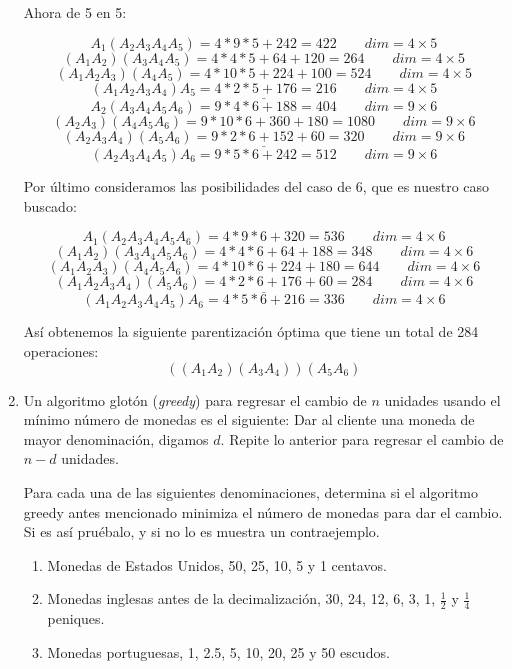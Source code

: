 \documentclass[11pt,letterpaper]{article}
\begin{document}
\begin{enumerate}[leftmargin=*]
    Ahora de 5 en 5:

    \[ A_1(A_2A_3A_4A_5) = 4*9*5+242 = 422 \qquad dim = 4\times5 \]    
    \[ (A_1A_2)(A_3A_4A_5) = 4*4*5+64+120 = 264 \qquad dim = 4\times5 \]  
    \[ (A_1A_2A_3)(A_4A_5) = 4*10*5+224+100 = 524 \qquad dim = 4\times5 \]  
    \[ \underline{(A_1A_2A_3A_4)A_5 = 4*2*5+176 = 216 \qquad dim = 4\times5} \]  
    \[ A_2(A_3A_4A_5A_6) = 9*4*6+188 = 404 \qquad dim = 9\times6 \]    
    \[ (A_2A_3)(A_4A_5A_6) = 9*10*6+360+180 = 1080 \qquad dim = 9\times6 \]    
    \[ \underline{(A_2A_3A_4)(A_5A_6) = 9*2*6+152+60 = 320 \qquad dim = 9\times6} \]    
    \[ (A_2A_3A_4A_5)A_6 = 9*5*6+242 = 512 \qquad dim = 9\times6 \]    

    Por último consideramos las posibilidades del caso de 6, que es nuestro caso buscado:

    \[ A_1(A_2A_3A_4A_5A_6) = 4*9*6+320 = 536 \qquad dim = 4\times6 \]
    \[ (A_1A_2)(A_3A_4A_5A_6) = 4*4*6+64+188 = 348 \qquad dim = 4\times6 \]
    \[ (A_1A_2A_3)(A_4A_5A_6) = 4*10*6+224+180 = 644 \qquad dim = 4\times6 \]
    \[ \underline{(A_1A_2A_3A_4)(A_5A_6) = 4*2*6+176+60 = 284 \qquad dim = 4\times6} \]
    \[ (A_1A_2A_3A_4A_5)A_6 = 4*5*6+216 = 336 \qquad dim = 4\times6 \]

    Así obtenemos la siguiente parentización óptima que tiene un total de 284 operaciones:
    \[ ((A_1A_2)(A_3A_4))(A_5A_6) \]

    \item Un algoritmo glotón (\textit{greedy}) para regresar el cambio de $n$ unidades usando el mínimo número de monedas es el siguiente: Dar al cliente una moneda de mayor denominación, digamos $d$. Repite lo anterior para regresar el cambio de $n - d$ unidades.
    
    Para cada una de las siguientes denominaciones, determina si el algoritmo greedy antes mencionado minimiza el número de monedas para dar el cambio. Si es así pruébalo, y si no lo es muestra un contraejemplo.
    
    \begin{enumerate}[label=\alph*)]
        \item Monedas de Estados Unidos, 50, 25, 10, 5 y 1 centavos.
        
        \item Monedas inglesas antes de la decimalización, 30, 24, 12, 6, 3, 1, $\frac{1}{2}$ y $\frac{1}{4}$ peniques.
        
        \item Monedas portuguesas, 1, 2.5, 5, 10, 20, 25 y 50 escudos.
        

\end{enumerate}
\end{enumerate}
\end{document}

